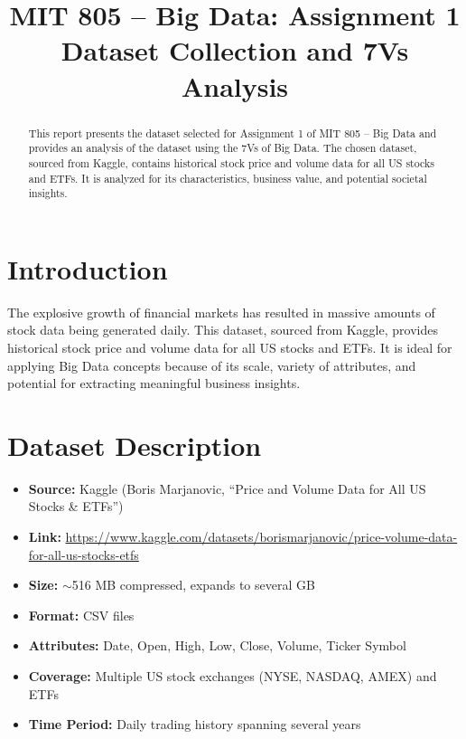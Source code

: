 \documentclass[conference]{IEEEtran}
\begin{document}
\title{MIT 805 – Big Data: Assignment 1 \\ Dataset Collection and 7Vs Analysis}

\author{
}

\maketitle

\begin{abstract}
This report presents the dataset selected for Assignment 1 of MIT 805 – Big Data and provides an analysis of the dataset using the 7Vs of Big Data. The chosen dataset, sourced from Kaggle, contains historical stock price and volume data for all US stocks and ETFs. It is analyzed for its characteristics, business value, and potential societal insights.
\end{abstract}

\section{Introduction}
The explosive growth of financial markets has resulted in massive amounts of stock data being generated daily. This dataset, sourced from Kaggle, provides historical stock price and volume data for all US stocks and ETFs. It is ideal for applying Big Data concepts because of its scale, variety of attributes, and potential for extracting meaningful business insights.

\section{Dataset Description}
\begin{itemize}
    \item \textbf{Source:} Kaggle (Boris Marjanovic, “Price and Volume Data for All US Stocks \& ETFs”)
    \item \textbf{Link:} \url{https://www.kaggle.com/datasets/borismarjanovic/price-volume-data-for-all-us-stocks-etfs}
    \item \textbf{Size:} $\sim$516 MB compressed, expands to several GB
    \item \textbf{Format:} CSV files
    \item \textbf{Attributes:} Date, Open, High, Low, Close, Volume, Ticker Symbol
    \item \textbf{Coverage:} Multiple US stock exchanges (NYSE, NASDAQ, AMEX) and ETFs
    \item \textbf{Time Period:} Daily trading history spanning several years
\end{itemize}
\end{document}
